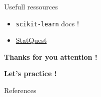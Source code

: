 \documentclass{irdbeamer}
\begin{document}
\begin{frame}{Usefull ressources}
\begin{itemize}
    \item \texttt{scikit-learn} docs !
    \item \href{https://www.youtube.com/@statquest}{StatQuest}
\end{itemize}
\end{frame}

\begin{frame}[plain]
    \Huge{\textbf{Thanks for you attention !}}
    
    \vfill
    
    \LARGE{\textbf{Let's practice !}}
\end{frame}

\appendix
\begin{frame}[allowframebreaks]{References}
    {\footnotesize \printbibliography[heading=none]}
\end{frame}
\end{document}
